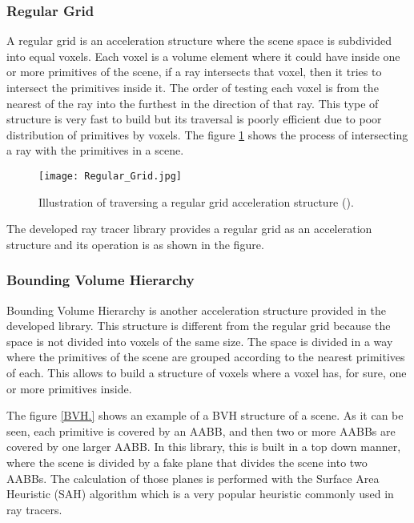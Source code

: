 \subsubsection{Regular Grid}

\par
A regular grid is an acceleration structure where the scene space is subdivided into equal voxels.
Each voxel is a volume element where it could have inside one or more primitives of the scene, if a ray intersects that voxel, then it tries to intersect the primitives inside it.
The order of testing each voxel is from the nearest of the ray into the furthest in the direction of that ray.
This type of structure is very fast to build but its traversal is poorly efficient due to poor distribution of primitives by voxels.
The figure \ref{RegularGrid.} shows the process of intersecting a ray with the primitives in a scene.

\begin{figure}[H]
	\centering
	\caption{Illustration of traversing a regular grid acceleration structure (\cite{RegularGrid}).}
	\label{RegularGrid.}
	\texttt{[image: Regular\_Grid.jpg]}
\end{figure}

\par
The developed ray tracer library provides a regular grid as an acceleration structure and its operation is as shown in the figure.

\subsubsection{Bounding Volume Hierarchy}

\par
Bounding Volume Hierarchy is another acceleration structure provided in the developed library.
This structure is different from the regular grid because the space is not divided into voxels of the same size.
The space is divided in a way where the primitives of the scene are grouped according to the nearest primitives of each.
This allows to build a structure of voxels where a voxel has, for sure, one or more primitives inside.

\par
The figure \ref{BVH.} shows an example of a BVH structure of a scene.
As it can be seen, each primitive is covered by an AABB, and then two or more AABBs are covered by one larger AABB.
In this library, this is built in a top down manner, where the scene is divided by a fake plane that divides the scene into two AABBs.
The calculation of those planes is performed with the Surface Area Heuristic (SAH) algorithm which is a very popular heuristic commonly used in ray tracers.

